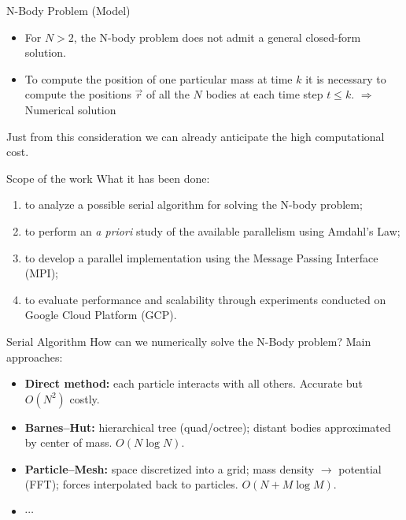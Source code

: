 \documentclass{beamer}
\begin{document}
\begin{frame}{N-Body Problem (Model)}
\begin{itemize}
	\item For \( N > 2 \), the N-body problem does not admit a general closed-form solution.%
	\item To compute the position of one particular mass at time $k$ it is necessary to compute the positions $\vec r$ of all the $N$ bodies at each time step $t \leq k$. $\Rightarrow$ Numerical solution%
\end{itemize}
Just from this consideration we can already anticipate the high computational cost.
\end{frame}


\begin{frame}{Scope of the work}
What it has been done:
\begin{enumerate}
\item to analyze a possible serial algorithm for solving the N-body problem;
\item to perform an \emph{a priori} study of the available parallelism using Amdahl's Law;
\item to develop a parallel implementation using the Message Passing Interface (MPI);
\item to evaluate performance and scalability through experiments conducted on Google Cloud Platform (GCP).
\end{enumerate}
\end{frame}

\begin{frame}{Serial Algorithm}
How can we numerically solve the N-Body problem?  
Main approaches:
\begin{itemize}
    \item \textbf{Direct method:} each particle interacts with all others. Accurate but $O(N^2)$ costly.%
    \item \textbf{Barnes–Hut:} hierarchical tree (quad/octree); distant bodies approximated by center of mass. $O(N \log N)$.%
    \item \textbf{Particle–Mesh:} space discretized into a grid; mass density $\rightarrow$ potential (FFT); forces interpolated back to particles. $O(N + M \log M)$. %
    \item $\cdots$
\end{itemize}
\end{frame}
\end{document}
